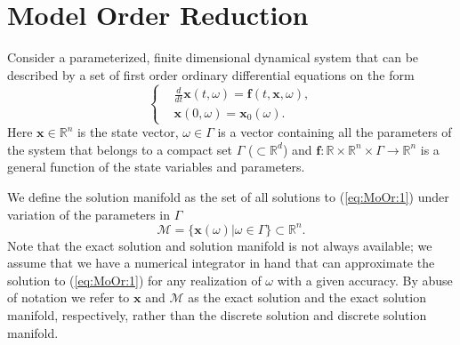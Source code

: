\section{Model Order Reduction} \label{chap:MoOr:1}
Consider a parameterized, finite dimensional dynamical system that can be described by a set of first order ordinary differential equations on the form
\begin{equation} \label{eq:MoOr:1}
\left\{
\begin{split}
& \frac{d}{dt} \mathbf{x}(t,\omega) = \mathbf f (t,\mathbf x,\omega), \\
& \mathbf x(0,\omega) = \mathbf x_0(\omega).
\end{split}
\right.
\end{equation}
Here $\mathbf x \in \mathbb R^n$ is the state vector, $\omega \in \Gamma$ is a vector containing all the parameters of the system that belongs to a compact set $\Gamma$ ($\subset \mathbb R^d$) and $\mathbf f : \mathbb R \times \mathbb R^n \times \Gamma \to \mathbb R^n$ is a general function of the state variables and parameters.

We define the solution manifold as the set of all solutions to (\ref{eq:MoOr:1}) under variation of {\edit the parameters in $\Gamma$}
\begin{equation} \label{eq:MoOr:2}
	\mathcal M = \{ \mathbf x(\omega) | \omega \in \Gamma \} \subset \mathbb R^n.
\end{equation}
Note that the exact solution and solution manifold is not always available; we assume that we have a numerical integrator in hand that can approximate the solution to (\ref{eq:MoOr:1}) for any realization of $\omega$ {\edit with a given accuracy}. By abuse of notation we refer to $\mathbf x$ and $\mathcal M$ as the exact solution and the exact solution manifold, respectively, rather than the discrete solution and discrete solution manifold. 

